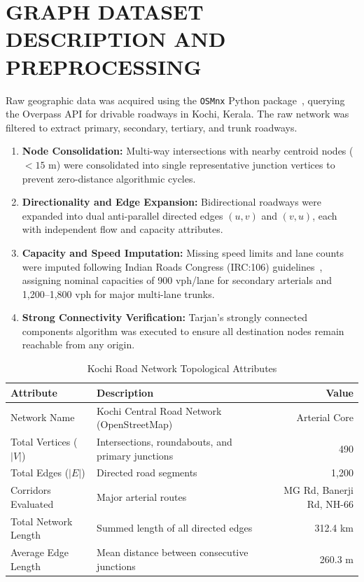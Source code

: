 \documentclass[12pt,a4paper]{report}
\begin{document}
\section{GRAPH DATASET DESCRIPTION AND PREPROCESSING}
Raw geographic data was acquired using the \texttt{OSMnx} Python package~\cite{boeing2017osmnx}, querying the Overpass API for drivable roadways in Kochi, Kerala. The raw network was filtered to extract primary, secondary, tertiary, and trunk roadways.
\begin{enumerate}
  \item \textbf{Node Consolidation:} Multi-way intersections with nearby centroid nodes ($< 15$ m) were consolidated into single representative junction vertices to prevent zero-distance algorithmic cycles.
  \item \textbf{Directionality and Edge Expansion:} Bidirectional roadways were expanded into dual anti-parallel directed edges $(u, v)$ and $(v, u)$, each with independent flow and capacity attributes.
  \item \textbf{Capacity and Speed Imputation:} Missing speed limits and lane counts were imputed following Indian Roads Congress (IRC:106) guidelines~\cite{irc106}, assigning nominal capacities of 900 vph/lane for secondary arterials and 1,200--1,800 vph for major multi-lane trunks.
  \item \textbf{Strong Connectivity Verification:} Tarjan's strongly connected components algorithm was executed to ensure all destination nodes remain reachable from any origin.
\end{enumerate}

\begin{table}[H]
\centering
\caption{Kochi Road Network Topological Attributes}
\label{tab:network_attributes}
\vspace{0.15cm}
\footnotesize
\begin{tabularx}{\textwidth}{lXr}
\toprule
\textbf{Attribute} & \textbf{Description} & \textbf{Value} \\
\midrule
Network Name & Kochi Central Road Network (OpenStreetMap) & Arterial Core \\
Total Vertices ($|V|$) & Intersections, roundabouts, and primary junctions & 490 \\
Total Edges ($|E|$) & Directed road segments & 1,200 \\
Corridors Evaluated & Major arterial routes & MG Rd, Banerji Rd, NH-66 \\
Total Network Length & Summed length of all directed edges & 312.4 km \\
Average Edge Length & Mean distance between consecutive junctions & 260.3 m \\
\bottomrule
\end{tabularx}
\end{table}
\end{document}
